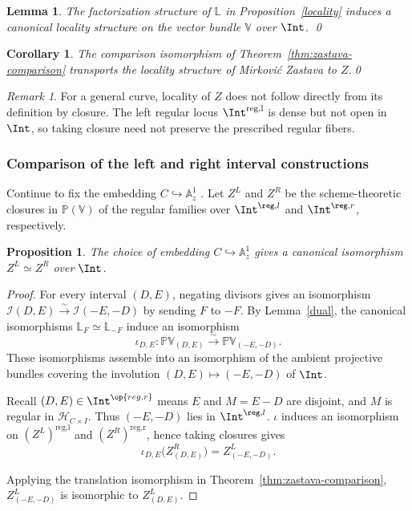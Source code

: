 \documentclass{amsart}
\numberwithin{equation}{section}
\numberwithin{figure}{section}
\newtheorem{lem}[thm]{Lemma}
\newtheorem{prop}[thm]{Proposition}
\newtheorem{cor}[thm]{Corollary}
\theoremstyle{definition}
\theoremstyle{remark}
\newtheorem{rmk}[thm]{Remark}
\renewcommand{\c}[1]{\mathcal{#1}}
\renewcommand{\b}[1]{\mathbb{#1}}
\begin{document}
\begin{lem}
	\label{prop:interval-vector-locality}
	The factorization structure of $\b L$ in
	Proposition~\ref{locality} induces a canonical locality
	structure on the vector bundle $\b V$ over $\Int$.
	\qed
\end{lem}

\begin{cor}
	\label{cor:interval-locality}
	The comparison isomorphism	of Theorem~\ref{thm:zastava-comparison} transports the 	locality structure of Mirkovi\'c Zastava to $Z$.\qed	
\end{cor}

\begin{rmk}
	For a general curve, locality of $Z$ does not
	follow directly from its definition by closure.
	The left regular locus $\Int^{\mathrm{reg,l}}$ is dense
	but not open in $\Int$, so taking closure need not
	preserve the prescribed regular fibers.
\end{rmk}


\subsubsection{Comparison of the left and right interval constructions}
 Continue to fix the embedding $C\hookrightarrow\b A^1_z$ . Let $Z^L$ and $Z^R$ be the
scheme-theoretic closures in $\b P(\b V)$ of the regular families over
$\Int^{\reg,l}$ and $\Int^{\reg,r}$, respectively.

\begin{prop}
	\label{prop:left-right-zastava}
	The choice of embedding $C\hookrightarrow\b A^1_z$ gives a canonical isomorphism $Z^L\simeq Z^R$ over $\Int$.
\end{prop}

\begin{proof}
	For every interval $(D,E)$, negating divisors gives an isomorphism
	$\c I(D,E)\xrightarrow{\sim}\c I(-E,-D)$ by sending $F$ to $-F$.
	By Lemma~\ref{dual}, the canonical isomorphisms
	$\b L_F\simeq\b L_{-F}$ induce an isomorphism
	\[
	\iota_{D,E}:\b P\b V_{(D,E)}
	\xrightarrow{\sim}\b P\b V_{(-E,-D)}.
	\]
	These isomorphisms assemble into an isomorphism of the ambient projective
	bundles covering the involution $(D,E)\mapsto(-E,-D)$ of $\Int$.
	
	Recall $(D,E)\in\Int^{\op{reg,r}}$ means $E$ and $M=E-D$ are
	disjoint, and $M$ is regular in $\c H_{C\times I}$. 
	Thus $(-E,-D)$ lies in $\Int^{\reg,l}$. $\iota$ induces an isomorphism on $(Z^L)^{\text{reg,l}}$ and $(Z^R)^{\text{reg,r}}$, hence taking closures gives
	\[	\iota_{D,E}\bigl(Z^R_{(D,E)}\bigr)	=Z^L_{(-E,-D)}.	\]
	
	Applying the translation isomorphism in Theorem~\ref{thm:zastava-comparison}, $Z^L_{(-E,-D)}$ is isomorphic to $Z^L_{(D,E)}$.
\end{proof}
\end{document}
